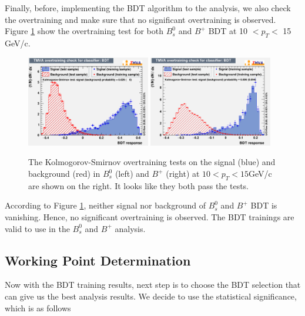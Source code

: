 Finally, before, implementing the BDT algorithm to the analysis, we also check the overtraining and make sure that no significant overtraining is observed. Figure \ref{OverTraining} show the overtraining test for both $B^0_s$ and $B^+$ BDT at 10 $< p_T < $ 15 GeV/c. 


\begin{figure}[h]
\begin{center}
\includegraphics[width= 0.48\textwidth]{Figures/Chapter5/BsOT.eps}
\includegraphics[width= 0.48\textwidth]{Figures/Chapter5/BPOT.pdf}
\caption{The Kolmogorov-Smirnov overtraining tests on the signal (blue) and background (red) in $B^0_s$ (left) and $B^+$ (right) at $10 < p_T < 15$GeV/c are shown on the right. It looks like they both pass the tests.}
\label{OverTraining}
\end{center}
\end{figure}

According to Figure \ref{OverTraining}, neither signal nor background of $B^0_s$ and $B^+$ BDT is vanishing. Hence, no significant overtraining is observed. The BDT trainings are valid to use in the $B^0_s$ and $B^+$ analysis.


\subsection{Working Point Determination}

Now with the BDT training results, next step is to choose the BDT selection that can give us the best analysis results. We decide to use the statistical significance, which is as follows

